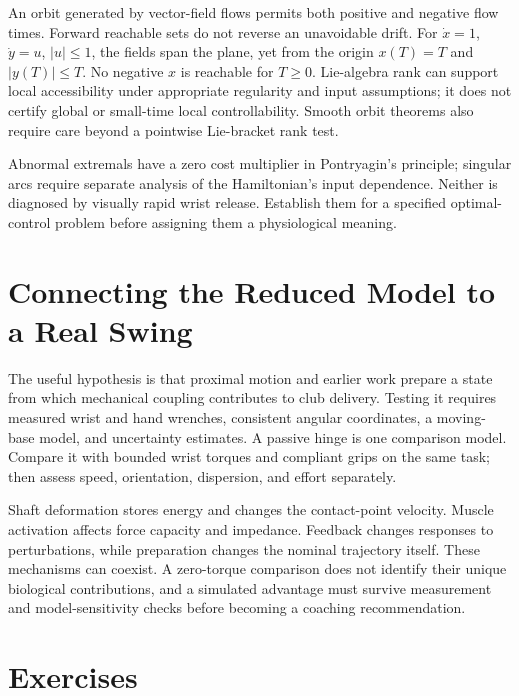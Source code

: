\documentclass[12pt, openany]{book}
\theoremstyle{plain}
\begin{document}
An orbit generated by vector-field flows permits both positive and negative
flow times. Forward reachable sets do not reverse an unavoidable drift.
For $\dot x=1$, $\dot y=u$, $|u|\leq1$, the fields span the plane, yet from
the origin $x(T)=T$ and $|y(T)|\leq T$. No negative $x$ is reachable for
$T\geq0$. Lie-algebra rank can support local accessibility under appropriate
regularity and input assumptions; it does not certify global or small-time
local controllability. Smooth orbit theorems also require care beyond a
pointwise Lie-bracket rank test.

Abnormal extremals have a zero cost multiplier in Pontryagin's principle;
singular arcs require separate analysis of the Hamiltonian's input dependence.
Neither is diagnosed by visually rapid wrist release. Establish them for a
specified optimal-control problem before assigning them a physiological meaning.

\section{Connecting the Reduced Model to a Real Swing}

The useful hypothesis is that proximal motion and earlier work prepare a state
from which mechanical coupling contributes to club delivery. Testing it requires
measured wrist and hand wrenches, consistent angular coordinates, a moving-base
model, and uncertainty estimates. A passive hinge is one comparison model.
Compare it with bounded wrist torques and compliant grips on the same task;
then assess speed, orientation, dispersion, and effort separately.

Shaft deformation stores energy and changes the contact-point velocity. Muscle
activation affects force capacity and impedance. Feedback changes responses to
perturbations, while preparation changes the nominal trajectory itself. These
mechanisms can coexist. A zero-torque comparison does not identify their unique
biological contributions, and a simulated advantage must survive measurement
and model-sensitivity checks before becoming a coaching recommendation.

\section{Exercises}
\end{document}

